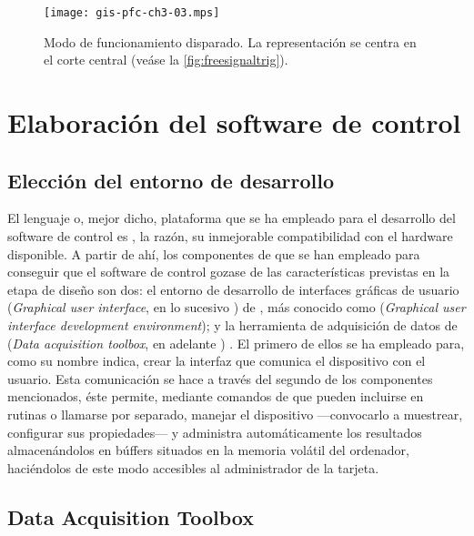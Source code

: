 \begin{figure}
	\begin{center}
		\texttt{[image: gis-pfc-ch3-03.mps]}
	\end{center}
	\caption[Modo de funcionamiento disparado]{Modo de funcionamiento disparado. La representación se centra en el corte central (veáse la \vref{fig:freesignaltrig}).}
	\label{fig:modtrig}
\end{figure}


\section{Elaboración del software de control}


\subsection{Elección del entorno de desarrollo}\label{subsec:environment}

El lenguaje o, mejor dicho, plataforma que se ha empleado para el desarrollo del software de control es \matlab{}, la razón, su inmejorable compatibilidad con el hardware disponible. A partir de ahí, los componentes de \matlab{} que se han empleado para conseguir que el software de control gozase de las características previstas en la etapa de diseño son dos: el entorno de desarrollo de interfaces gráficas de usuario (\emph{Graphical user interface}, en lo sucesivo ) de \matlab{}, más conocido como  (\emph{Graphical user interface development environment}); y la herramienta de adquisición de datos de \matlab{} (\emph{Data acquisition toolbox}, en adelante ) . El primero de ellos se ha empleado para, como su nombre indica, crear la interfaz que comunica el dispositivo con el usuario. Esta comunicación se hace a través del segundo de los componentes mencionados, éste permite, mediante comandos de \matlab{} que pueden incluirse en rutinas o llamarse por separado, manejar el dispositivo ---convocarlo a muestrear, configurar sus propiedades--- y administra automáticamente los resultados almacenándolos en búffers situados en la memoria volátil del ordenador, haciéndolos de este modo accesibles al administrador de la tarjeta.


\subsection{Data Acquisition Toolbox}

